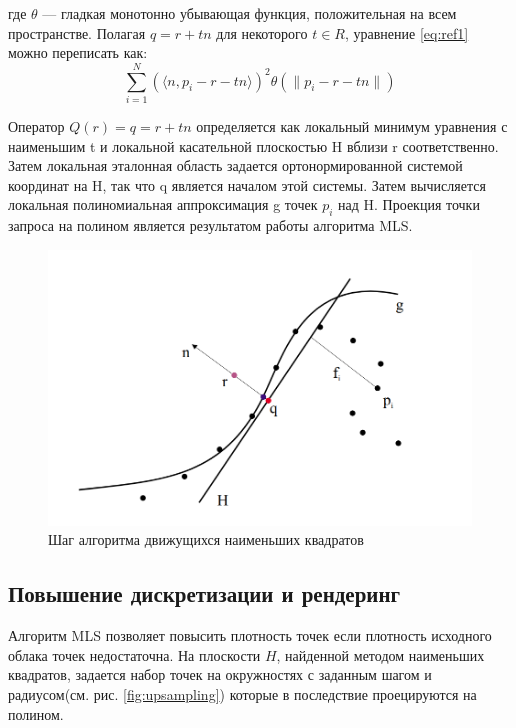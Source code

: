 где $\theta$ — гладкая монотонно убывающая функция, положительная на всем пространстве. Полагая $q = r + tn$ для некоторого $t \in R$, уравнение \ref{eq:ref1} можно переписать как: 
 $$\sum_{i = 1}^{N}(\langle n, p_i - r - tn \rangle)^{2} \theta(\parallel p_i - r - tn \parallel)$$
 
  Оператор $Q(r) = q = r + tn$ определяется как локальный минимум уравнения  с наименьшим t и локальной касательной плоскостью H вблизи r соответственно. Затем локальная эталонная область задается ортонормированной системой координат на H, так что q является началом этой системы. Затем вычисляется локальная полиномиальная аппроксимация g точек $p_i$ над H. Проекция точки запроса на полином является результатом работы алгоритма MLS.

\begin{figure}[h]
    \centering
    \includegraphics[scale=0.5]{images/0.png}
    \caption{Шаг алгоритма движущихся наименьших квадратов}
    \label{fig:0}
\end{figure}

\subsection{Повышение дискретизации и рендеринг}

Алгоритм MLS позволяет повысить плотность точек если плотность исходного облака точек недостаточна.  На плоскости $H$, найденной методом наименьших квадратов, задается набор точек на окружностях с заданным шагом и радиусом(см. рис. \ref{fig:upsampling}) которые в последствие проецируются на полином.

